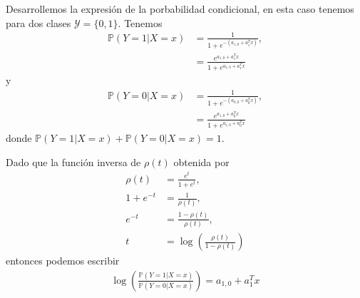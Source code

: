 \documentclass[a4paper, 11pt]{article}
\begin{document}
Desarrollemos la expresión de la porbabilidad condicional, en esta caso tenemos para dos clases $\mathcal{Y} = \{0,1\}$. Tenemos 
\begin{align*}
  \mathbb{P}(Y=1|X= x ) &= \frac{1}{1+e^{-(a_{1,0} + a_1^T x)}} ,\\
  & = \frac{e^{a_{1,0} + a_1^T x}}{1 + e^{a_{1,0} + a_1^T x}}
\end{align*}
y 
\begin{align*}
\mathbb{P}(Y=0|X= x ) &= \frac{1}{1+e^{-(a_{0,0} + a_0^T x)}} ,\\
& = \frac{e^{a_{1,0} + a_0^T x}}{1 + e^{a_{1,0} + a_0^T x}}
\end{align*}
donde $\mathbb{P}(Y=1|X= x ) + \mathbb{P}(Y=0|X= x ) =1 $. 

Dado que la función inversa de $\rho(t )$ obtenida por
\begin{align*}
  \rho (t) &= \frac{e^t}{1+ e^t }  ,\\
  1+ e^{-t } &= \frac{1}{\rho(t )} ,\\
  e^{-t } & = \frac{1-\rho(t )}{\rho(t )},\\
  t & = \log \left (\frac{\rho(t )}{1-\rho(t )} \right )
\end{align*}
entonces podemos escribir
\begin{align*}
  \log \left( \frac{\mathbb{P }(Y = 1 |X = x)}{\mathbb{P }(Y = 0 |X = x)}\right) = a_{1,0} + a_{1}^T x 
\end{align*}
\end{document}
